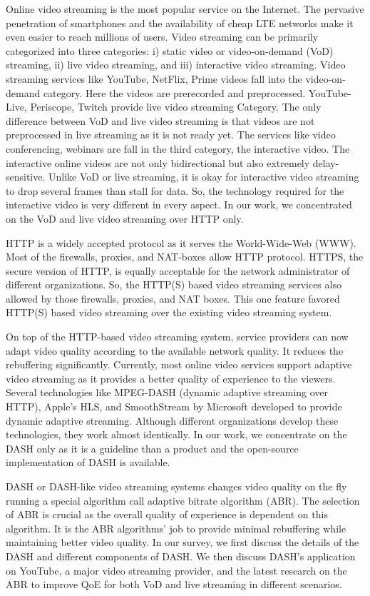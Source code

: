 Online video streaming is the most popular service on the Internet. The pervasive penetration of smartphones and the availability of cheap LTE networks make it even easier to reach millions of users. Video streaming can be primarily categorized into three categories: i) static video or video-on-demand (VoD) streaming, ii) live video streaming, and iii) interactive video streaming. Video streaming services like YouTube, NetFlix, Prime videos fall into the video-on-demand category. Here the videos are prerecorded and preprocessed. YouTube-Live, Periscope, Twitch provide live video streaming Category. The only difference between VoD and live video streaming is that videos are not preprocessed in live streaming as it is not ready yet. The services like video conferencing, webinars are fall in the third category, the interactive video. The interactive online videos are not only bidirectional but also extremely delay-sensitive. Unlike VoD or live streaming, it is okay for interactive video streaming to drop several frames than stall for data. So, the technology required for the interactive video is very different in every aspect. In our work, we concentrated on the VoD and live video streaming over HTTP only.

HTTP is a widely accepted protocol as it serves the World-Wide-Web (WWW). Most of the firewalls, proxies, and NAT-boxes allow HTTP protocol. HTTPS, the secure version of HTTP, is equally acceptable for the network administrator of different organizations. So, the HTTP(S) based video streaming services also allowed by those firewalls, proxies, and NAT boxes. This one feature favored HTTP(S) based video streaming over the existing video streaming system.

On top of the HTTP-based video streaming system, service providers can now adapt video quality according to the available network quality. It reduces the rebuffering significantly. Currently, most online video services support adaptive video streaming as it provides a better quality of experience to the viewers. Several technologies like MPEG-DASH (dynamic adaptive streaming over HTTP), Apple's HLS, and SmoothStream by Microsoft developed to provide dynamic adaptive streaming. Although different organizations develop these technologies, they work almost identically. In our work, we concentrate on the DASH only as it is a guideline than a product and the open-source implementation of DASH is available.

DASH or DASH-like video streaming systems changes video quality on the fly running a special algorithm call adaptive bitrate algorithm (ABR). The selection of ABR is crucial as the overall quality of experience is dependent on this algorithm. It is the ABR algorithms' job to provide minimal rebuffering while maintaining better video quality. In our survey, we first discuss the details of the DASH and different components of DASH. We then discuss DASH's application on YouTube, a major video streaming provider, and the latest research on the ABR to improve QoE for both VoD and live streaming in different scenarios.

